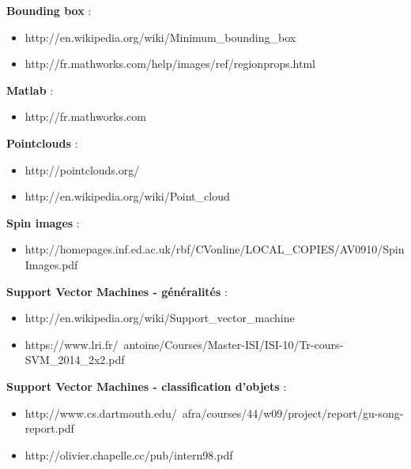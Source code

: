 \textbf{Bounding box} :
\begin{itemize}
	\item http://en.wikipedia.org/wiki/Minimum\_bounding\_box
	\item http://fr.mathworks.com/help/images/ref/regionprops.html
\end{itemize}

\textbf{Matlab} : 
\begin{itemize}
	\item http://fr.mathworks.com
\end{itemize}

\textbf{Pointclouds} : 
\begin{itemize}
	\item http://pointclouds.org/
	\item http://en.wikipedia.org/wiki/Point\_cloud
\end{itemize}

\textbf{Spin images} :
\begin{itemize}
	\item http://homepages.inf.ed.ac.uk/rbf/CVonline/LOCAL\_COPIES/AV0910/SpinImages.pdf
\end{itemize}

\textbf{Support Vector Machines - généralités} : 
\begin{itemize}
	\item http://en.wikipedia.org/wiki/Support\_vector\_machine
	\item https://www.lri.fr/~antoine/Courses/Master-ISI/ISI-10/Tr-cours-SVM\_2014\_2x2.pdf
\end{itemize}

\textbf{Support Vector Machines - classification d'objets} :
\begin{itemize}
	\item http://www.cs.dartmouth.edu/~afra/courses/44/w09/project/report/gu-song-report.pdf
	\item http://olivier.chapelle.cc/pub/intern98.pdf
\end{itemize}

